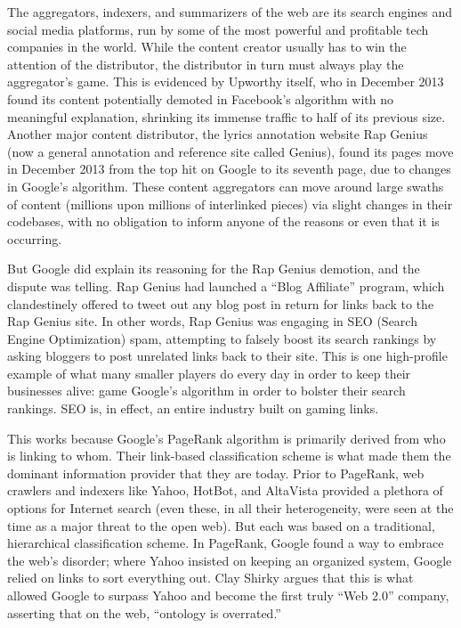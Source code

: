 The aggregators, indexers, and summarizers of the web are its search engines and social media platforms, run by some of the most powerful and profitable tech companies in the world. While the content creator usually has to win the attention of the distributor, the distributor in turn must always play the aggregator's game. This is evidenced by Upworthy itself, who in December 2013 found its content potentially demoted in Facebook's algorithm with no meaningful explanation, shrinking its immense traffic to half of its previous size.\autocite{carlson_upworthy_2014} Another major content distributor, the lyrics annotation website Rap Genius (now a general annotation and reference site called Genius), found its pages move in December 2013 from the top hit on Google to its seventh page, due to changes in Google's algorithm.\autocite{constine_google_2013} These content aggregators can move around large swaths of content (millions upon millions of interlinked pieces) via slight changes in their codebases, with no obligation to inform anyone of the reasons or even that it is occurring.

But Google did explain its reasoning for the Rap Genius demotion, and the dispute was telling. Rap Genius had launched a ``Blog Affiliate'' program, which clandestinely offered to tweet out any blog post in return for links back to the Rap Genius site. In other words, Rap Genius was engaging in SEO (Search Engine Optimization) spam, attempting to falsely boost its search rankings by asking bloggers to post unrelated links back to their site. This is one high-profile example of what many smaller players do every day in order to keep their businesses alive: game Google's algorithm in order to bolster their search rankings. SEO is, in effect, an entire industry built on gaming links.

This works because Google's PageRank algorithm is primarily derived from who is linking to whom. Their link-based classification scheme is what made them the dominant information provider that they are today. Prior to PageRank, web crawlers and indexers like Yahoo, HotBot, and AltaVista provided a plethora of options for Internet search (even these, in all their heterogeneity, were seen at the time as a major threat to the open web). But each was based on a traditional, hierarchical classification scheme. In PageRank, Google found a way to embrace the web's disorder; where Yahoo insisted on keeping an organized system, Google relied on links to sort everything out. Clay Shirky argues that this is what allowed Google to surpass Yahoo and become the first truly ``Web 2.0'' company, asserting that on the web, ``ontology is overrated.''\autocite{shirky_ontology_2005}

